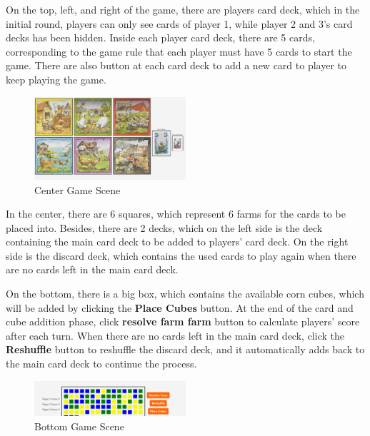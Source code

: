 \documentclass[conference]{IEEEtran}
\begin{document}
On the top, left, and right of the game, there are players card deck, which in the initial round, players can only see cards of player 1, while player 2 and 3's card decks has been hidden. Inside each player card deck, there are 5 cards, corresponding to the game rule that each player must have 5 cards to start the game. There are also button at each card deck to add a new card to player to keep playing the game.

\begin{figure}[h!]
    \centering
    \includegraphics[width=0.5\textwidth]{img/Screenshot 2025-01-14 120930.png} %
    \caption{Center Game Scene}
    \label{fig:use-case-diagram}
\end{figure}

\vspace{0.5cm}

In the center, there are 6 squares, which represent 6 farms for the cards to be placed into. 
Besides, there are 2 decks, which on the left side is the deck containing the main card deck to be added to players' card deck. On the right side is the discard deck, which contains the used cards to play again when there are no cards left in the main card deck.

On the bottom, there is a big box, which contains the available corn cubes, which will be added by clicking the \textbf{Place Cubes} button. At the end of the card and cube addition phase, click \textbf{ resolve farm farm} button to calculate players' score after each turn. When there are no cards left in the main card deck, click the \textbf{Reshuffle} button to reshuffle the discard deck, and it automatically adds back to the main card deck to continue the process.

\vspace{0.5cm}

\begin{figure}[h!]
    \centering
    \includegraphics[width=0.5\textwidth]{img/Screenshot 2025-01-14 121133.png} %
    \caption{Bottom Game Scene}
    \label{fig:use-case-diagram}
\end{figure}
\end{document}
